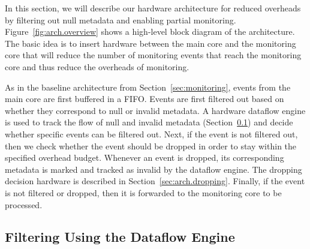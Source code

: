 In this section, we will describe our hardware architecture for reduced
overheads by filtering out null metadata and enabling partial monitoring.
Figure~\ref{fig:arch.overview} shows a high-level block diagram of the
architecture. The basic idea is to insert hardware between the main core and
the monitoring core that will reduce the number of monitoring events that reach
the monitoring core and thus reduce the overheads of monitoring.

As in the baseline architecture from Section~\ref{sec:monitoring}, events from
the main core are first buffered in a FIFO. 
Events are first filtered out based on whether they correspond to null or
invalid metadata. A hardware dataflow engine is used to track the flow of null
and invalid metadata (Section~\ref{sec:arch.dataflow}) and decide whether
specific events can be filtered out.
Next, if the event is not filtered out, then we
check whether the event should be dropped in order to stay within the specified
overhead budget. Whenever an event is dropped, its corresponding metadata is
marked and tracked as invalid by the dataflow engine. The
dropping decision hardware is described in Section~\ref{sec:arch.dropping}.
Finally, if the event is not filtered or dropped, then it is forwarded to the
monitoring core to be processed.

\subsection{Filtering Using the Dataflow Engine}
\label{sec:arch.dataflow}

